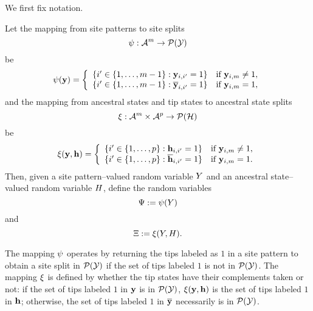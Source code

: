 We first fix notation.
\begin{definition}
Let the mapping from site patterns to site splits
\[
\psi:\mathcal{A}^m\rightarrow\mathcal{P}(\mathcal{Y})
\]
be
\[
\psi(\mathbf{y}) =
\left\{
    \begin{array}{ll}
        \{i'\in\{1,\ldots,m-1\}: \mathbf{y}_{i,i'}=1\}  & \mbox{if } \mathbf{y}_{i,m}\neq 1,\\
        \{i'\in\{1,\ldots,m-1\}: \overline{\mathbf{y}}_{i,i'}=1\}  & \mbox{if } \mathbf{y}_{i,m}=1,
    \end{array}
\right.
\]
and the mapping from ancestral states and tip states to ancestral state splits
\[
\xi:\mathcal{A}^m\times\mathcal{A}^p\rightarrow\mathcal{P}(\mathcal{H})
\]
be
\[
\xi(\mathbf{y}, \mathbf{h}) =
\left\{
    \begin{array}{ll}
        \{i'\in\{1,\ldots,p\}: \mathbf{h}_{i,i'}=1\}  & \mbox{if } \mathbf{y}_{i,m}\neq 1,\\
        \{i'\in\{1,\ldots,p\}: \overline{\mathbf{h}}_{i,i'}=1\}  & \mbox{if } \mathbf{y}_{i,m}=1.
    \end{array}
\right.
\]
Then, given a site pattern--valued random variable $Y$ and an ancestral state--valued random variable $H$, define the random variables
\[
\Psi := \psi(Y)
\]
and
\[
\Xi := \xi(Y, H).
\]
\end{definition}
The mapping $\psi$ operates by returning the tips labeled as $1$ in a site pattern to obtain a site split in $\mathcal{P}(\mathcal{Y})$ if the set of tips labeled $1$ is not in $\mathcal{P}(\mathcal{Y})$.
The mapping $\xi$ is defined by whether the tip states have their complements taken or not: if the set of tips labeled $1$ in $\mathbf{y}$ is in $\mathcal{P}(\mathcal{Y})$, $\xi(\mathbf{y}, \mathbf{h})$ is the set of tips labeled $1$ in $\mathbf{h}$; otherwise, the set of tips labeled $1$ in $\overline{\mathbf{y}}$ necessarily is in $\mathcal{P}(\mathcal{Y})$.

